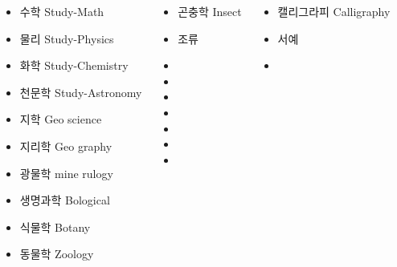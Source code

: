 \documentclass[	20pt, 
							a1paper, 
							landscape,
							margin=0mm, %
							innermargin=10mm,  		%
							blockverticalspace=4mm, %
							colspace=5mm, 
							subcolspace=0mm
							]{tikzposter}
\begin{document}
\begin{columns}


			{
					\begin{itemize}
					\item 수학       Study-Math
					\item 물리       Study-Physics
					\item 화학       Study-Chemistry
					\item 천문학    Study-Astronomy
					\item 지학       Geo science
					\item 지리학    Geo graphy
					\item 광물학    mine rulogy
					\item 생명과학 Bological 
					\item 식물학    Botany
					\item 동물학    Zoology
					\end{itemize}
			} %


			{
					\begin{itemize}
					\item 곤충학 Insect
					\item 조류
					\item 
					\item 
					\item 
					\item 
					\item 
					\item 
					\item 
					\end{itemize}
			} %






			{
					\begin{itemize}
					\item 캘리그라피 Calligraphy
					\item 서예
					\item 
					\end{itemize}
			} %



\end{columns}
\end{document}
